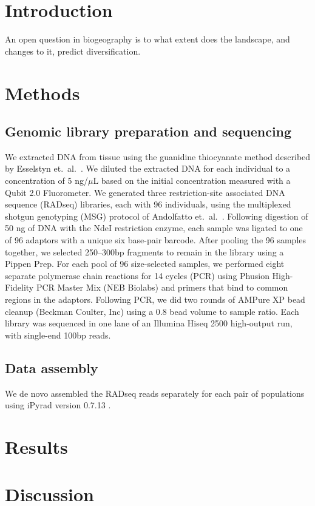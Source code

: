 \section{Introduction}

An open question in biogeography is to what extent does the landscape, and
changes to it, predict diversification.


\section{Methods}

\subsection{Genomic library preparation and sequencing}

We extracted DNA from tissue using the guanidine thiocyanate method described
by Esselstyn et.\ al.\ \citeyear{Esselstyn2008}.
We diluted the extracted DNA for each individual to a concentration of 5
ng/$\mu$L based on the initial concentration measured with a Qubit 2.0
Fluorometer.
We generated three restriction-site associated DNA sequence (RADseq) libraries,
each with 96 individuals, using the multiplexed shotgun genotyping (MSG)
protocol of Andolfatto et.\ al.\ \citep{Andolfatto2011}.
Following digestion of 50 ng of DNA with the NdeI restriction enzyme, each
sample was ligated to one of 96 adaptors with a unique six base-pair barcode.
After pooling the 96 samples together, we selected 250--300bp fragments to
remain in the library using a Pippen Prep.
For each pool of 96 size-selected samples, we performed eight separate
polymerase chain reactions for 14 cycles (PCR) using Phusion High-Fidelity PCR
Master Mix (NEB Biolabs) and primers that bind to common regions in the
adaptors.
Following PCR, we did two rounds of AMPure XP bead cleanup (Beckman Coulter,
Inc) using a 0.8 bead volume to sample ratio.
Each library was sequenced in one lane of an Illumina Hiseq 2500 high-output
run, with single-end 100bp reads.

\subsection{Data assembly}
We de novo assembled the RADseq reads separately for each pair of populations
using iPyrad version 0.7.13 \citep{ipyrad0713}.

\section{Results}

\section{Discussion}
